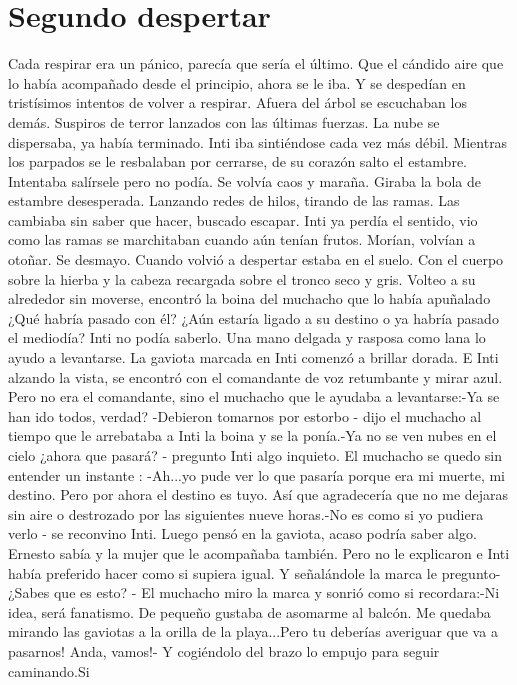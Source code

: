 
\chapter{Segundo despertar}

Cada respirar era un pánico, parecía que sería el último. Que el cándido aire que lo había acompañado desde el principio, ahora se le iba. Y se despedían en tristísimos intentos de volver a respirar. Afuera del árbol se escuchaban los demás. Suspiros de terror lanzados con las últimas fuerzas. La nube se dispersaba, ya había terminado. Inti iba sintiéndose cada vez más débil. Mientras los parpados se le resbalaban por cerrarse, de su corazón salto el estambre. Intentaba salírsele pero no podía. Se volvía caos y maraña. Giraba la bola de estambre desesperada. Lanzando redes de hilos, tirando de las ramas. Las cambiaba sin saber que hacer, buscado escapar. Inti ya perdía el sentido, vio como las ramas se marchitaban cuando aún tenían frutos. Morían, volvían a otoñar. Se desmayo. Cuando volvió a despertar estaba en el suelo. Con el cuerpo sobre la hierba y la cabeza recargada sobre el tronco seco y gris. Volteo a su alrededor sin moverse, encontró la boina del muchacho que lo había apuñalado ¿Qué habría pasado con él? ¿Aún estaría ligado a su destino o ya habría pasado el mediodía? Inti no podía saberlo. Una mano delgada y rasposa como lana lo ayudo a levantarse. La gaviota marcada en Inti comenzó a brillar dorada. E Inti alzando la vista, se encontró con el comandante de voz retumbante y mirar azul. Pero no era el comandante, sino el muchacho que le ayudaba a levantarse:-Ya se han ido todos, verdad? -Debieron tomarnos por estorbo - dijo el muchacho al tiempo que le arrebataba a Inti la boina y se la ponía.-Ya no se ven nubes en el cielo ¿ahora que pasará? - pregunto Inti algo inquieto. El muchacho se quedo sin entender un instante : -Ah...yo pude ver lo que pasaría porque era mi muerte, mi destino. Pero por ahora el destino es tuyo. Así que agradecería que no me dejaras sin aire o destrozado por las siguientes nueve horas.-No es como si yo pudiera verlo - se reconvino Inti. Luego pensó en la gaviota, acaso podría saber algo. Ernesto sabía y la mujer que le acompañaba también. Pero no le explicaron e Inti había preferido hacer como si supiera igual. Y señalándole la marca le pregunto- ¿Sabes que es esto? - El muchacho miro la marca y sonrió como si recordara:-Ni idea, será fanatismo. De pequeño gustaba de asomarme al balcón. Me quedaba mirando las gaviotas a la orilla de la playa...Pero tu deberías averiguar que va a pasarnos! Anda, vamos!- Y cogiéndolo del brazo lo empujo para seguir caminando.Si

